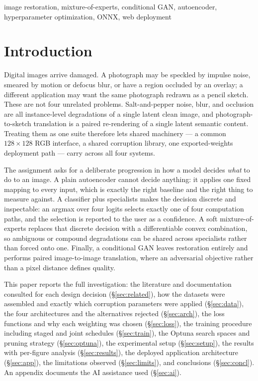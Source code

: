 \documentclass[journal]{IEEEtran}
\begin{document}
\begin{IEEEkeywords}
image restoration, mixture-of-experts, conditional GAN, autoencoder, hyperparameter optimization, ONNX, web deployment
\end{IEEEkeywords}

\IEEEpeerreviewmaketitle

\section{Introduction}
\label{sec:intro}

Digital images arrive damaged. A photograph may be speckled by impulse noise, smeared by motion or defocus blur, or have a region occluded by an overlay; a different application may want the same photograph redrawn as a pencil sketch. These are not four unrelated problems. Salt-and-pepper noise, blur, and occlusion are all instance-level degradations of a single latent clean image, and photograph-to-sketch translation is a paired re-rendering of a single latent semantic content. Treating them as one suite therefore lets shared machinery --- a common $128\times128$ RGB interface, a shared corruption library, one exported-weights deployment path --- carry across all four systems.

The assignment asks for a deliberate progression in how a model decides \emph{what} to do to an image. A plain autoencoder cannot decide anything: it applies one fixed mapping to every input, which is exactly the right baseline and the right thing to measure against. A classifier plus specialists makes the decision discrete and inspectable: an argmax over four logits selects exactly one of four computation paths, and the selection is reported to the user as a confidence. A soft mixture-of-experts replaces that discrete decision with a differentiable convex combination, so ambiguous or compound degradations can be shared across specialists rather than forced onto one. Finally, a conditional GAN leaves restoration entirely and performs paired image-to-image translation, where an adversarial objective rather than a pixel distance defines quality.

This paper reports the full investigation: the literature and documentation consulted for each design decision (\S\ref{sec:related}), how the datasets were assembled and exactly which corruption parameters were applied (\S\ref{sec:data}), the four architectures and the alternatives rejected (\S\ref{sec:arch}), the loss functions and why each weighting was chosen (\S\ref{sec:loss}), the training procedure including staged and joint schedules (\S\ref{sec:train}), the Optuna search spaces and pruning strategy (\S\ref{sec:optuna}), the experimental setup (\S\ref{sec:setup}), the results with per-figure analysis (\S\ref{sec:results}), the deployed application architecture (\S\ref{sec:app}), the limitations observed (\S\ref{sec:limits}), and conclusions (\S\ref{sec:concl}). An appendix documents the AI assistance used (\S\ref{sec:ai}).
\end{document}

